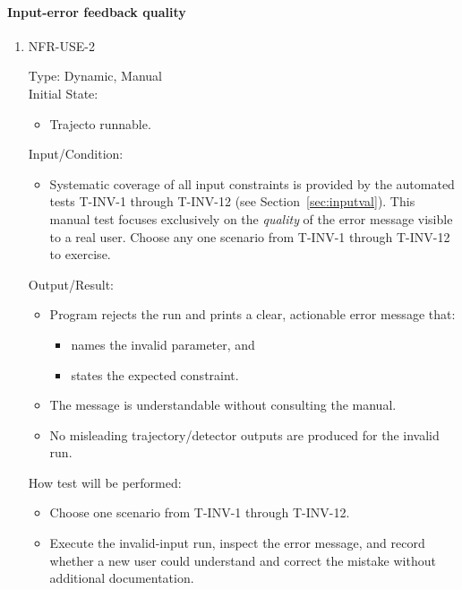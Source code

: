 \documentclass[12pt, titlepage]{article}
\begin{document}
\paragraph{Input-error feedback quality}

\begin{enumerate}

\item{NFR-USE-2\\}

Type: Dynamic, Manual\\

Initial State:
\begin{itemize}
  \item Trajecto runnable.
\end{itemize}

Input/Condition:
\begin{itemize}
  \item Systematic coverage of all input constraints is provided by the automated
        tests T-INV-1 through T-INV-12 (see Section~\ref{sec:inputval}). This
        manual test focuses exclusively on the \emph{quality} of the error message
        visible to a real user.  Choose any one scenario from T-INV-1 through
        T-INV-12 to exercise.
\end{itemize}

Output/Result:
\begin{itemize}
  \item Program rejects the run and prints a clear, actionable error message that:
  \begin{itemize}
    \item names the invalid parameter, and
    \item states the expected constraint.
  \end{itemize}
  \item The message is understandable without consulting the manual.
  \item No misleading trajectory/detector outputs are produced for the invalid run.
\end{itemize}

How test will be performed:
\begin{itemize}
  \item Choose one scenario from T-INV-1 through T-INV-12.
  \item Execute the invalid-input run, inspect the error message, and record
        whether a new user could understand and correct the mistake without
        additional documentation.
\end{itemize}

\end{enumerate}
\end{document}
